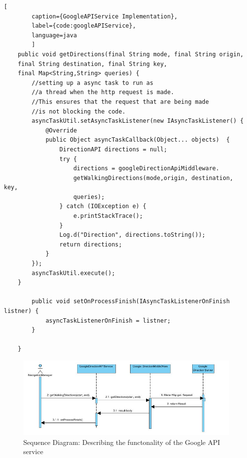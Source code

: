 \begin{lstlisting}[
        caption={GoogleAPIService Implementation},
        label={code:googleAPIService},
        language=java
        ]
    public void getDirections(final String mode, final String origin, 
    final String destination, final String key, 
    final Map<String,String> queries) {
        //setting up a async task to run as 
        //a thread when the http request is made.
        //This ensures that the request that are being made 
        //is not blocking the code.
        asyncTaskUtil.setAsyncTaskListener(new IAsyncTaskListener() {
            @Override
            public Object asyncTaskCallback(Object... objects)  {
                DirectionAPI directions = null;
                try {
                    directions = googleDirectionApiMiddleware.
                    getWalkingDirections(mode,origin, destination, key, 
                    queries);
                } catch (IOException e) {
                    e.printStackTrace();
                }
                Log.d("Direction", directions.toString());
                return directions;
            }
        });
        asyncTaskUtil.execute();
    }

        public void setOnProcessFinish(IAsyncTaskListenerOnFinish listner) {
            asyncTaskListenerOnFinish = listner;
        }

    }
\end{lstlisting}    


\begin{figure}[htbp!]
    \centering \includegraphics[scale=0.75]{grafiken/seqDigGoogleAPI.jpg}
    \caption{Sequence Diagram: Describing the functonality of the Google API service}
    \label{fig:directionServiceSeqDiagram}
\end{figure}
